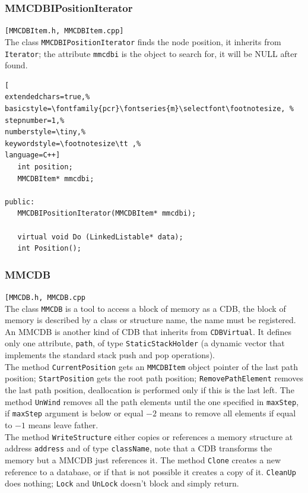 \subsubsection{MMCDBIPositionIterator}
\texttt{[MMCDBItem.h, MMCDBItem.cpp]}\\
The class \texttt{MMCDBIPositionIterator} finds the node position, it inherits from \texttt{Iterator}; the attribute \texttt{mmcdbi} is the object to search for, it will be NULL after found.

\begin{lstlisting}[
extendedchars=true,%
basicstyle=\fontfamily{pcr}\fontseries{m}\selectfont\footnotesize, %
stepnumber=1,%
numberstyle=\tiny,%
keywordstyle=\footnotesize\tt ,%
language=C++]
   int position;
   MMCDBItem* mmcdbi;

public:
   MMCDBIPositionIterator(MMCDBItem* mmcdbi);

   virtual void Do (LinkedListable* data);
   int Position();
\end{lstlisting}



\subsubsection{MMCDB}
\texttt{[MMCDB.h, MMCDB.cpp}\\
The class \texttt{MMCDB} is a tool to access a block of memory as a CDB, the block of memory is described by a class or structure name, the name must be registered. An MMCDB is another kind of CDB that inherits from \texttt{CDBVirtual}. It defines only one attribute, \texttt{path}, of type \texttt{StaticStackHolder} (a dynamic vector that implements the standard stack push and pop operations). \\


The method \texttt{CurrentPosition} gets an \texttt{MMCDBItem} object pointer of the last path position; \texttt{StartPosition} gets the root path position; \texttt{RemovePathElement} removes the last path position, deallocation is performed only if this is the last left. The method \texttt{UnWind} removes all the path elements until the one specified in \texttt{maxStep}, if \texttt{maxStep} argument is below or equal $-2$ means to remove all elements if equal to $-1$ means leave father. \\


The method \texttt{WriteStructure} either copies or references a memory structure at address \texttt{address} and of type \texttt{className}, note that a CDB transforms the memory but a MMCDB just references it.
The method \texttt{Clone} creates a new reference to a database, or if that is not possible it creates a copy of it. \texttt{CleanUp} does nothing; \texttt{Lock} and \texttt{UnLock} doesn't block and simply return.

